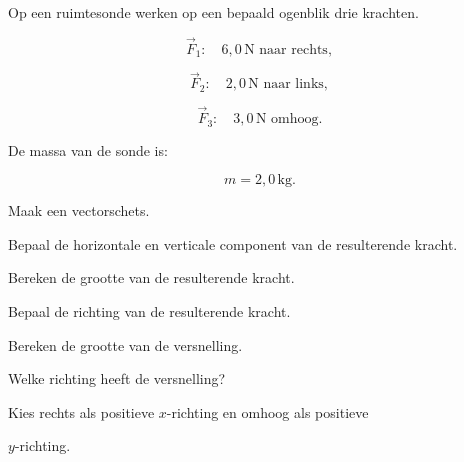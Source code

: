 \documentclass{ximera}
\begin{document}
\begin{oefening}{\oefU\ESS}

Op een ruimtesonde werken op een bepaald ogenblik drie krachten.

\[\vec F_1: \quad 6{,}0\,\mathrm N \text{ naar rechts},\]

\[\vec F_2: \quad 2{,}0\,\mathrm N \text{ naar links},\]

\[\vec F_3: \quad 3{,}0\,\mathrm N \text{ omhoog}.\]

De massa van de sonde is:

\[m=2{,}0\,\mathrm{kg}.\]

\begin{question}

Maak een vectorschets.

\end{question}

\begin{question}

Bepaal de horizontale en verticale component van de resulterende kracht.

\end{question}

\begin{question}

Bereken de grootte van de resulterende kracht.

\end{question}

\begin{question}

Bepaal de richting van de resulterende kracht.

\end{question}

\begin{question}

Bereken de grootte van de versnelling.

\end{question}

\begin{question}

Welke richting heeft de versnelling?

\end{question}


\begin{oplossing}

Kies rechts als positieve $x$-richting en omhoog als positieve

$y$-richting.


\end{oplossing}
\end{oefening}
\end{document}
